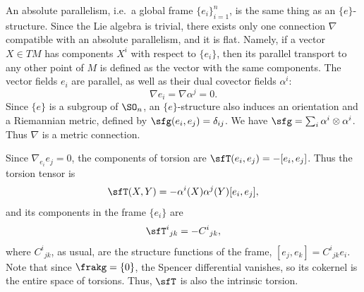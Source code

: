 \begin{example}\label{ex absolute parallelism}
    An absolute parallelism, i.e.\ a global frame $\{e_i\}_{i=1}^n$, is the same thing as an $\{e\}$-structure. Since the Lie algebra is trivial, there exists only one connection $\nabla$ compatible with an absolute parallelism, and it is flat. Namely, if a vector $X\in TM$ has components $X^i$ with respect to $\{e_i\}$, then its parallel transport to any other point of $M$ is defined as the vector with the same components. The vector fields $e_i$ are parallel, as well as their dual covector fields $\alpha^i$:
    \[\nabla e_i=\nabla \alpha^j=0.\]
    Since $\{e\}$ is a subgroup of $\SO_n$, an $\{e\}$-structure also induces an orientation and a Riemannian metric, defined by $\sfg(e_i,e_j)=\delta_{ij}$. We have $\sfg=\sum_i \alpha^i\otimes\alpha^i$. Thus $\nabla$ is a metric connection.

    Since $\nabla_{e_i}e_j=0$, the components of torsion are $\sfT(e_i,e_j)=-[e_i,e_j]$. Thus the torsion tensor is
    \[\sfT(X,Y)=-\alpha^i(X)\alpha^j(Y)[e_i,e_j],\]
    and its components in the frame $\{e_i\}$ are 
    \[\sfT^i{}_{jk}=-C^i{}_{jk},\]
    where $C^i{}_{jk}$, as usual, are the structure functions of the frame, $[e_j,e_k]=C^i{}_{jk}e_i$. Note that since $\frakg=\{0\}$, the Spencer differential vanishes, so its cokernel is the entire space of torsions. Thus, $\sfT$ is also the intrinsic torsion.


\end{example}
